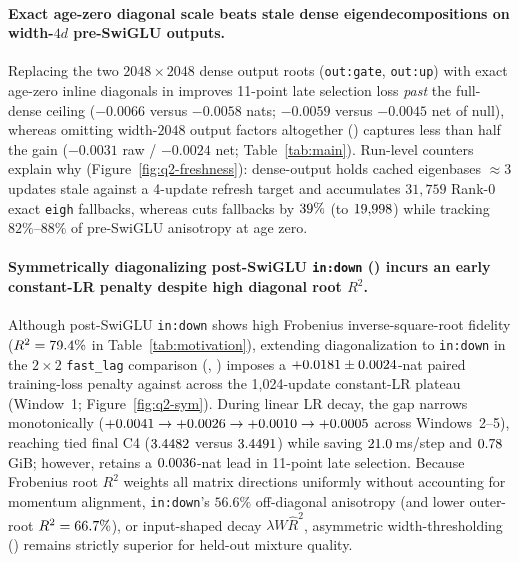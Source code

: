 \paragraph{Exact age-zero diagonal scale beats stale dense eigendecompositions on width-$4d$ pre-SwiGLU outputs.}
Replacing the two $2048\times 2048$ dense output roots (\texttt{out:gate},
\texttt{out:up}) with exact age-zero inline diagonals in 
improves 11-point late selection loss \emph{past} the full-dense ceiling
 ($-0.0066$ versus $-0.0058$ nats; $-0.0059$ versus $-0.0045$ net
of null), whereas omitting width-$2048$ output factors altogether
() captures less than half the gain ($-0.0031$ raw / $-0.0024$
net; Table~\ref{tab:main}). Run-level counters explain why
(Figure~\ref{fig:q2-freshness}): dense-output  holds cached
eigenbases $\approx 3$ updates stale against a 4-update refresh target and
accumulates $31{,}759$ Rank-0 exact \texttt{eigh} fallbacks, whereas
 cuts fallbacks by $39\%$ (to
$19{,}998$) while tracking $82\%$--$88\%$ of pre-SwiGLU
anisotropy at age zero.

\paragraph{Symmetrically diagonalizing post-SwiGLU \texttt{in:down} () incurs an early constant-LR penalty despite high diagonal root $R^2$.}
Although post-SwiGLU \texttt{in:down} shows high Frobenius inverse-square-root
fidelity ($R^2 = 79.4\%$ in Table~\ref{tab:motivation}),
extending diagonalization to \texttt{in:down} in the $2\times 2$ \texttt{fast\_lag}
comparison (, ) imposes a
$+0.0181{} \pm 0.0024{}$-nat paired training-loss
penalty against  across the 1{,}024-update constant-LR plateau
(Window~1; Figure~\ref{fig:q2-sym}). During linear LR decay, the gap narrows
monotonically ($+0.0041{} \to +0.0026{} \to
+0.0010{} \to +0.0005{}$ across Windows~2--5),
reaching tied final C4 ($3.4482{}$ versus
$3.4491{}$) while saving $21.0$\,ms/step
and $0.78$\,GiB; however,  retains a
$0.0036{}$-nat lead in 11-point late selection. Because
Frobenius root $R^2$ weights all matrix directions uniformly without accounting
for momentum alignment, \texttt{in:down}'s $56.6\%$ off-diagonal anisotropy
(and lower outer-root $R^2 = 66.7\%$), or input-shaped
decay $\lambda W \hat R^2$, asymmetric width-thresholding ()
remains strictly superior for held-out mixture quality.

